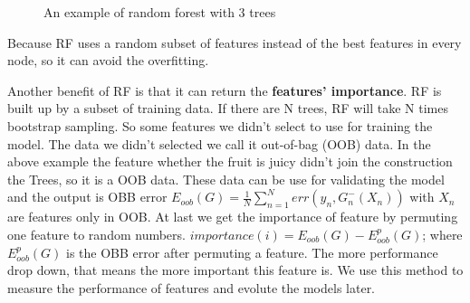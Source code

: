 \begin{figure}[!h]
  \caption{An example of random forest with 3 trees}
\label{fig:randomforest}
\end{figure}


Because RF uses a random subset of features instead of the best features in every node, so it can avoid the overfitting\cite{breiman2001random}. 

Another benefit of RF is that it can return the \textbf{features' importance}. RF is built up by a subset of training data. If there are N trees, RF will take N times bootstrap sampling. So some features we didn't select to use for training the model. The data we didn't selected we call it out-of-bag (OOB) data. In the above example the feature whether the fruit is juicy didn't join the construction the Trees, so it is a OOB data. These data can be use for validating the model and the output is OBB error $E_{oob}(G) = \frac {1}{N} \sum_{n=1}^{N}err(y_n,G_{n}^-(X_n))$ with $X_n$ are features only in OOB. At last we get the importance of feature by permuting one feature to random numbers. $importance(i)= E_{oob}(G)-E_{oob}^{p}(G)$; where $E_{oob}^{p}(G)$ is the OBB error after permuting a feature. The more performance drop down, that means the more important this feature is. We use this method to measure the performance of features and evolute the models later.
